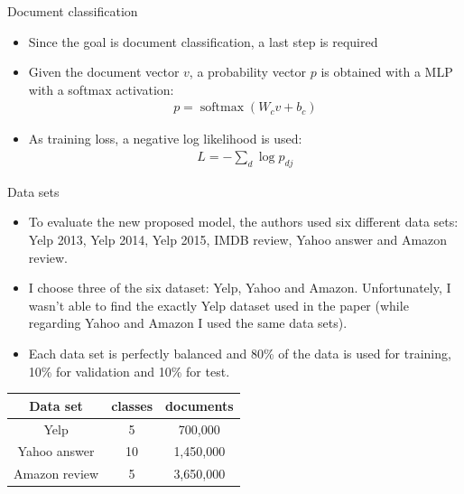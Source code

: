 \documentclass[10pt]{beamer}
\begin{document}
\begin{frame}{Document classification}

\begin{itemize}
\item
Since the goal is document classification, a last step is required
\item
Given the document vector $v$, a probability vector $p$ is obtained with a MLP with a softmax activation:
\begin{align*}
p = \operatorname{softmax}\left(W_cv+b_c\right)
\end{align*}

\item
As training loss, a negative log likelihood is used:
\begin{align*}
L = -\sum_d\log p_{dj}
\end{align*}
\end{itemize}

\end{frame}


\begin{frame}{Data sets}

\begin{itemize}
\item
To evaluate the new proposed model, the authors used six different data sets: Yelp 2013, Yelp 2014, Yelp 2015, IMDB review, Yahoo answer and Amazon review.
\item
I choose three of the six dataset: Yelp, Yahoo and Amazon. Unfortunately, I wasn't able to find the exactly Yelp dataset used in the paper (while regarding Yahoo and Amazon I used the same data sets).
\item
Each data set is perfectly balanced and 80\% of the data is used for training, 10\% for validation and 10\% for test.
\end{itemize}

\begin{table}[]
\begin{tabular}{|c|c|c|}
\hline
\textbf{Data set} & \textbf{classes}  & \textbf{documents}  \\
\hline
Yelp & 5 & 700,000 \\
\hline
Yahoo answer & 10 & 1,450,000 \\
\hline
Amazon review & 5 & 3,650,000  \\
\hline
\end{tabular}
\end{table}

\end{frame}
\end{document}
